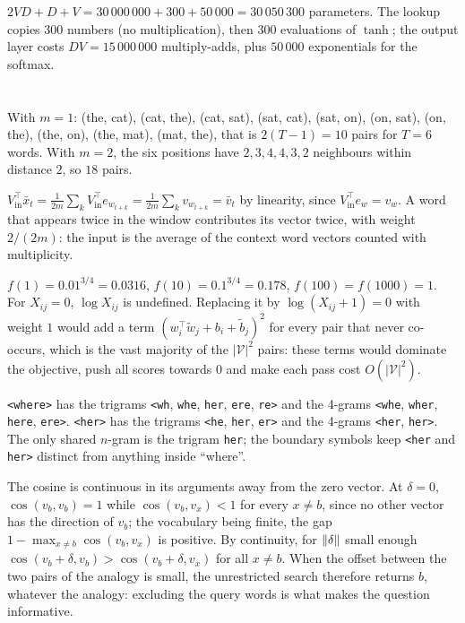 $2VD + D + V = 30\,000\,000 + 300 + 50\,000 = 30\,050\,300$ parameters. The lookup copies $300$ numbers (no multiplication),
then $300$ evaluations of $\tanh$; the output layer costs $DV = 15\,000\,000$ multiply-adds, plus $50\,000$ exponentials for the
softmax.

\section{}

With $m = 1$: (the, cat), (cat, the), (cat, sat), (sat, cat), (sat, on), (on, sat), (on, the), (the, on), (the, mat), (mat, the),
that is $2(T - 1) = 10$ pairs for $T = 6$ words. With $m = 2$, the six positions have $2, 3, 4, 4, 3, 2$ neighbours within
distance $2$, so $18$ pairs.

$V_{\mathrm{in}}^\top\bar x_t = \frac1{2m}\sum_kV_{\mathrm{in}}^\top e_{w_{t+k}} = \frac1{2m}\sum_kv_{w_{t+k}} = \bar v_t$ by linearity, since $V_{\mathrm{in}}^\top e_w = v_w$. A word that appears twice in the window
contributes its vector twice, with weight $2/(2m)$: the input is the average of the context word
vectors counted with multiplicity.

$f(1) = 0.01^{3/4} = 0.0316$, $f(10) = 0.1^{3/4} = 0.178$, $f(100) = f(1000) = 1$. For $X_{ij} = 0$, $\log X_{ij}$ is undefined. Replacing it by
$\log(X_{ij} + 1) = 0$ with weight $1$ would add a term $(w_i^\top\tilde w_j + b_i + \tilde b_j)^2$ for every pair that never co-occurs, which is the
vast majority of the $|\mathcal V|^2$ pairs: these terms would dominate the objective, push all scores towards $0$ and
make each pass cost $O(|\mathcal V|^2)$.

\texttt{<where>} has the trigrams \texttt{<wh}, \texttt{whe}, \texttt{her}, \texttt{ere}, \texttt{re>} and the 4-grams \texttt{<whe},
\texttt{wher}, \texttt{here}, \texttt{ere>}. \texttt{<her>} has the trigrams \texttt{<he}, \texttt{her}, \texttt{er>} and the 4-grams \texttt{<her},
\texttt{her>}. The only shared $n$-gram is the trigram \texttt{her}; the boundary symbols keep \texttt{<her} and
\texttt{her>} distinct from anything inside ``where''.

The cosine is continuous in its arguments away from the zero vector. At $\delta = 0$, $\cos(v_b, v_b) = 1$ while $\cos(v_b, v_x) < 1$
for every $x\neq b$, since no other vector has the direction of $v_b$; the vocabulary being finite, the gap
$1 - \max_{x\neq b}\cos(v_b, v_x)$ is positive. By continuity, for $\left\|\delta\right\|$ small enough $\cos(v_b + \delta, v_b) > \cos(v_b + \delta, v_x)$ for all $x\neq b$. When the
offset between the two pairs of the analogy is small, the unrestricted search therefore
returns $b$, whatever the analogy: excluding the query words is what makes the question
informative.


